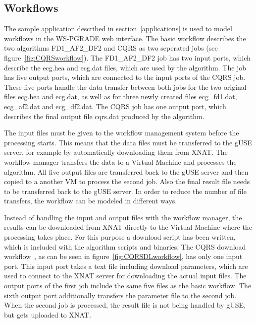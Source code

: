 \subsection{Workflows}\label{workflowimplementation}

The sample application described in section~\ref{applications} is used to model workflows in the WS-PGRADE web interface.
The basic workflow \cite{somnocqrs} describes the two algorithms FD1\_AF2\_DF2 and CQRS as two seperated jobs (see figure~\ref{fig:CQRSworkflow}).
The FD1\_AF2\_DF2 job has two input ports, which describe the ecg.hea and ecg.dat files, which are used by the algorithm.
The job has five output ports, which are connected to the input ports of the CQRS job.
These five ports handle the data transfer between both jobs for the two original files ecg.hea and ecg.dat, as well as for three newly created files ecg\_fd1.dat, ecg\_af2.dat and ecg\_df2.dat.
The CQRS job has one output port, which describes the final output file cqrs.dat produced by the algorithm.

The input files must be given to the workflow management system before the processing starts.
This means that the data files must be transferred to the gUSE server, for example by automatically downloading them from XNAT.
The workflow manager transfers the data to a Virtual Machine and processes the algorithm.
All five output files are transferred back to the gUSE server and then copied to a another VM to process the second job.
Also the final result file needs to be transferred back to the gUSE server.
In order to reduce the number of file transfers, the workflow can be modeled in different ways.

Instead of handling the input and output files with the workflow manager, the results can be downloaded from XNAT directly to the Virtual Machine where the processing takes place.
For this purpose a download script has been written, which is included with the algorithm scripts and binaries.
The CQRS download workflow~\cite{somnocqrsdl}, as can be seen in figure~\ref{fig:CQRSDLworkflow}, has only one input port.
This input port takes a text file including download parameters, which are used to connect to the XNAT server for downloading the actual input files.
The output ports of the first job include the same five files as the basic workflow.
The sixth output port additionally transfers the parameter file to the second job.
When the second job is processed, the result file is not being handled by gUSE, but gets uploaded to XNAT.

